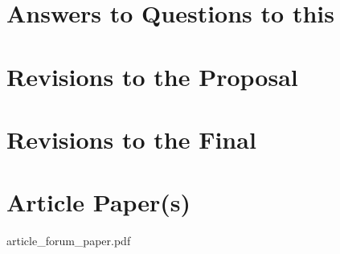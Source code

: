 	\chapter{Answers to Questions to this \documentType}
	
	\cleardoublepage
	
	\chapter{Revisions to the Proposal} 
	\label{ch:revisions_to_the_proposal}
	\cleardoublepage
	
	\chapter{Revisions to the Final} 
	\label{ch:revisions_to_the_final}
	
	\cleardoublepage
	
	
	\ifPubList
	
	\fi
	\cleardoublepage
	
	\ifVita
	
	\fi
	\cleardoublepage
	
	\ifIndex
	\printindex
	\fi
	
	\chapter{Article Paper(s)} 
	\label{ch:article_paper}
	\cleardoublepage
	{
	\ClearWallPaper
	
	{article_forum_paper.pdf}
	}
	\cleardoublepage

